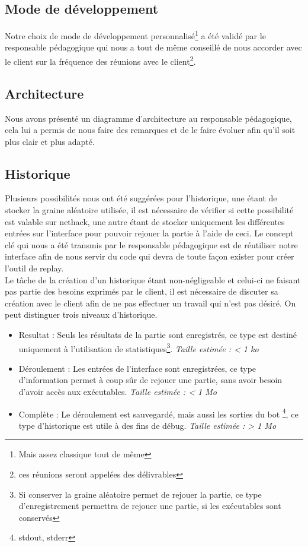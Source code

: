 \documentclass{article}
\begin{document}
\subsection*{Mode de développement}
Notre choix de mode de développement personnalisé\footnote{Mais assez classique tout de même} a été validé par le responsable pédagogique qui nous a tout de même conseillé de nous accorder avec le client sur la fréquence des réunions avec le client\footnote{ces réunions seront appelées des délivrables}.

\subsection*{Architecture}
Nous avons présenté un diagramme d'architecture au responsable pédagogique, cela lui a permis de nous faire des remarques et de le faire évoluer afin qu'il soit plus clair et plus adapté.

\subsection*{Historique}
Plusieurs possibilités nous ont été suggérées pour l'historique, une étant de stocker la graine aléatoire utilisée, il est nécessaire de vérifier si cette possibilité est valable sur nethack, une autre étant de stocker uniquement les différentes entrées sur l'interface pour pouvoir rejouer la partie à l'aide de ceci. Le concept clé qui nous a été transmis par le responsable pédagogique est de réutiliser notre interface afin de nous servir du code qui devra de toute façon exister pour créer l'outil de replay.\\
Le tâche de la création d'un historique étant non-négligeable et celui-ci ne faisant pas partie des besoins exprimés par le client, il est nécessaire de discuter sa création avec le client afin de ne pas effectuer un travail qui n'est pas désiré. On peut distinguer trois niveaux d'historique.
\begin{itemize}
\item Resultat : Seuls les résultats de la partie sont enregistrés, ce type est destiné uniquement à l'utilisation de statistiques\footnote{Si conserver la graine aléatoire permet de rejouer la partie, ce type d'enregistrement permettra de rejouer une partie, si les exécutables sont conservés}. {\em Taille estimée : < 1 ko}
\item Déroulement : Les entrées de l'interface sont enregistrées, ce type d'information permet à coup sûr de rejouer une partie, sans avoir besoin d'avoir accès aux exécutables. {\em Taille estimée : < 1 Mo}
\item Complète : Le déroulement est sauvegardé, mais aussi les sorties du bot \footnote{stdout, stderr}, ce type d'historique est utile à des fins de débug. {\em Taille estimée : > 1 Mo}
\end{itemize}
\end{document}
